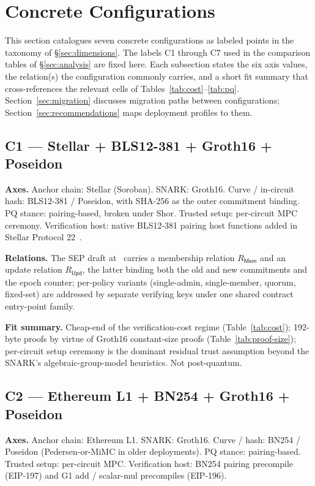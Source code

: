 \section{Concrete Configurations}
\label{sec:configurations}

This section catalogues seven concrete configurations as labeled
points in the taxonomy of \S\ref{sec:dimensions}. The labels C1
through C7 used in the comparison tables of \S\ref{sec:analysis} are
fixed here. Each subsection states the six axis values, the
relation(s) the configuration commonly carries, and a short fit
summary that cross-references the relevant cells of
Tables~\ref{tab:cost}--\ref{tab:pq}. Section~\ref{sec:migration}
discusses migration paths between configurations;
Section~\ref{sec:recommendations} maps deployment profiles to them.

\subsection{C1 --- Stellar + BLS12-381 + Groth16 + Poseidon}
\label{sec:cfg-c1}

\textbf{Axes.} Anchor chain: Stellar (Soroban). SNARK: Groth16.
Curve / in-circuit hash: BLS12-381 / Poseidon, with SHA-256 as the
outer commitment binding. PQ stance: pairing-based, broken under
Shor. Trusted setup: per-circuit MPC ceremony. Verification host:
native BLS12-381 pairing host functions added in Stellar Protocol
22~\cite{stellar-cap-0059}.

\textbf{Relations.} The SEP draft at~\cite{sep-onym} carries a
membership relation $R_{\mathsf{Mem}}$ and an update relation
$R_{\mathsf{Upd}}$, the latter binding both the old and new
commitments and the epoch counter; per-policy variants (single-admin,
single-member, quorum, fixed-set) are addressed by separate verifying
keys under one shared contract entry-point family.

\textbf{Fit summary.} Cheap-end of the verification-cost regime
(Table~\ref{tab:cost}); 192-byte proofs by virtue of Groth16
constant-size proofs (Table~\ref{tab:proof-size}); per-circuit setup
ceremony is the dominant residual trust assumption beyond the SNARK's
algebraic-group-model heuristics. Not post-quantum.

\subsection{C2 --- Ethereum L1 + BN254 + Groth16 + Poseidon}
\label{sec:cfg-c2}

\textbf{Axes.} Anchor chain: Ethereum L1. SNARK: Groth16.
Curve / hash: BN254 / Poseidon (Pedersen-or-MiMC in older
deployments). PQ stance: pairing-based. Trusted setup: per-circuit
MPC. Verification host: BN254 pairing precompile (EIP-197) and G1
add / scalar-mul precompiles (EIP-196).

